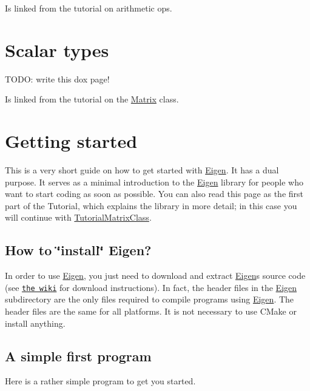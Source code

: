 Is linked from the tutorial on arithmetic ops. \hypertarget{TopicScalarTypes}{}\section{Scalar types}\label{TopicScalarTypes}
T\+O\+DO\+: write this dox page!

Is linked from the tutorial on the \hyperlink{group___core___module_class_eigen_1_1_matrix}{Matrix} class. \hypertarget{GettingStarted}{}\section{Getting started}\label{GettingStarted}
This is a very short guide on how to get started with \hyperlink{namespace_eigen}{Eigen}. It has a dual purpose. It serves as a minimal introduction to the \hyperlink{namespace_eigen}{Eigen} library for people who want to start coding as soon as possible. You can also read this page as the first part of the Tutorial, which explains the library in more detail; in this case you will continue with \hyperlink{group___tutorial_matrix_class}{Tutorial\+Matrix\+Class}.\hypertarget{_getting_started_GettingStartedInstallation}{}\subsection{How to \char`\"{}install\char`\"{} Eigen?}\label{_getting_started_GettingStartedInstallation}
In order to use \hyperlink{namespace_eigen}{Eigen}, you just need to download and extract \hyperlink{namespace_eigen}{Eigen}\textquotesingle{}s source code (see \href{http://eigen.tuxfamily.org/index.php?title=Main_Page#Download}{\tt the wiki} for download instructions). In fact, the header files in the {\ttfamily \hyperlink{namespace_eigen}{Eigen}} subdirectory are the only files required to compile programs using \hyperlink{namespace_eigen}{Eigen}. The header files are the same for all platforms. It is not necessary to use C\+Make or install anything.\hypertarget{_getting_started_GettingStartedFirstProgram}{}\subsection{A simple first program}\label{_getting_started_GettingStartedFirstProgram}
Here is a rather simple program to get you started.


\begin{DoxyCodeInclude}
\end{DoxyCodeInclude}


